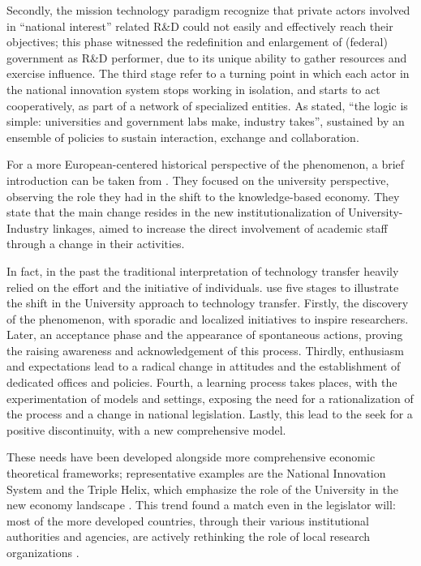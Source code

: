 Secondly, the mission technology paradigm recognize that private actors involved in \enquote{national interest} related R\&D could not easily and effectively reach their objectives; this phase witnessed the redefinition and enlargement of (federal) government as R\&D performer, due to its unique ability to gather resources and exercise influence. The third stage refer to a turning point in which each actor in the national innovation system stops working in isolation, and starts to act cooperatively, as part of a network of specialized entities. As stated, \enquote{the logic is simple: universities and government labs make, industry takes}, sustained by an ensemble of policies to sustain interaction, exchange and collaboration. 

For a more European-centered historical perspective of the phenomenon, a brief introduction can be taken from \citet{Geuna2009}. They focused on the university perspective, observing the role they had in the shift to the knowledge-based economy. They state that the main change resides in the new institutionalization of University-Industry linkages, aimed to increase the direct involvement of academic staff through a change in their activities.

In fact, in the past the traditional interpretation of technology transfer heavily relied on the effort and the initiative of individuals. \citet{Balderi2007} use five stages to illustrate the shift in the University approach to technology transfer. Firstly, the discovery of the phenomenon, with sporadic and localized initiatives to inspire researchers. Later, an acceptance phase and the appearance of spontaneous actions, proving the raising awareness and acknowledgement of this process. Thirdly, enthusiasm and expectations lead to a radical change in attitudes and the establishment of dedicated offices and policies. Fourth, a learning process takes places, with the experimentation of models and settings, exposing the need for a rationalization of the process and a change in national legislation. Lastly, this lead to the seek for a positive discontinuity, with a new comprehensive model.

These needs have been developed alongside more comprehensive economic theoretical frameworks; representative examples are the National Innovation System and the Triple Helix, which emphasize the role of the University in the new economy landscape \citep{Balderi2007}. This trend found a match even in the legislator will: most of the more developed countries, through their various institutional authorities and agencies, are actively rethinking the role of local research organizations \citep{Geuna2009}.

